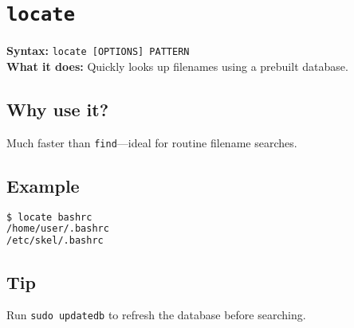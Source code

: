 \documentclass[10pt,oneside]{scrbook}
\begin{document}
\section{\texttt{locate}}
\begin{cmdbox}
  \textbf{Syntax:} \lstinline!locate [OPTIONS] PATTERN! \\
  \textbf{What it does:} Quickly looks up filenames using a prebuilt database.
\end{cmdbox}
\begin{commanddetails}
  \subsection*{Why use it?}
    Much faster than \texttt{find}—ideal for routine filename searches.

  \subsection*{Example}
  \begin{lstlisting}[language=bash]
$ locate bashrc
/home/user/.bashrc
/etc/skel/.bashrc
  \end{lstlisting}

  \subsection*{Tip}
    Run \lstinline!sudo updatedb! to refresh the database before searching.
\end{commanddetails}

\end{document}
